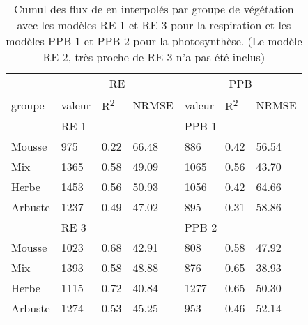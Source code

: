 
\begin{table}
\centering
\caption{Cumul des flux de \coo en \si{\gcma} interpolés par groupe de végétation avec les modèles RE-1 et RE-3 pour la respiration et les modèles PPB-1 et PPB-2 pour la photosynthèse. (Le modèle RE-2, très proche de RE-3 n'a pas été inclus)}
\label{table:flux_grp}
\begin{tabular}{lllllll}\toprule
& \multicolumn{3}{c}{RE} &  \multicolumn{3}{c}{PPB} \\ \cmidrule(lr){2-4} \cmidrule(lr){5-7} 
groupe & valeur & R\textsuperscript{2} & NRMSE & valeur & R\textsuperscript{2} & NRMSE\\ \midrule
& \multicolumn{3}{l}{RE-1} &  \multicolumn{3}{l}{PPB-1} \\
Mousse &  \num{975} & \num{0.22} & \num{66.48} & \num{886} & \num{0.42} & \num{56.54} \\
Mix &  \num{1365} & \num{0.58} & \num{49.09} & \num{1065} & \num{0.56} & \num{43.70}  \\
Herbe &  \num{1453} & \num{0.56} & \num{50.93}  & \num{1056} & \num{0.42} & \num{64.66} \\
Arbuste &  \num{1237} & \num{0.49} & \num{47.02} & \num{895} & \num{0.31} & \num{58.86}  \\ [+1ex]
& \multicolumn{3}{l}{RE-3} &  \multicolumn{3}{l}{PPB-2} \\
Mousse &  \num{1023} & \num{0.68} & \num{42.91} & \num{808} & \num{0.58} & \num{47.92} \\
Mix &  \num{1393} & \num{0.58} & \num{48.88} & \num{876} & \num{0.65} & \num{38.93}  \\
Herbe &  \num{1115} & \num{0.72} & \num{40.84}  & \num{1277} & \num{0.65} & \num{50.30} \\
Arbuste &  \num{1274} & \num{0.53} & \num{45.25} & \num{953} & \num{0.46} & \num{52.14}  \\
\bottomrule
\end{tabular}
\end{table}

